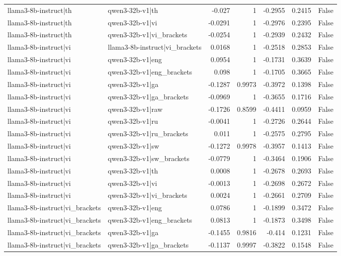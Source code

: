 \begin{table}
\begin{tabular}{l l r r r r l}
llama3-8b-instruct|th & qwen3-32b-v1|th & -0.027 & 1 & -0.2955 & 0.2415 & False \\
llama3-8b-instruct|th & qwen3-32b-v1|vi & -0.0291 & 1 & -0.2976 & 0.2395 & False \\
llama3-8b-instruct|th & qwen3-32b-v1|vi_brackets & -0.0254 & 1 & -0.2939 & 0.2432 & False \\
llama3-8b-instruct|vi & llama3-8b-instruct|vi_brackets & 0.0168 & 1 & -0.2518 & 0.2853 & False \\
llama3-8b-instruct|vi & qwen3-32b-v1|eng & 0.0954 & 1 & -0.1731 & 0.3639 & False \\
llama3-8b-instruct|vi & qwen3-32b-v1|eng_brackets & 0.098 & 1 & -0.1705 & 0.3665 & False \\
llama3-8b-instruct|vi & qwen3-32b-v1|ga & -0.1287 & 0.9973 & -0.3972 & 0.1398 & False \\
llama3-8b-instruct|vi & qwen3-32b-v1|ga_brackets & -0.0969 & 1 & -0.3655 & 0.1716 & False \\
llama3-8b-instruct|vi & qwen3-32b-v1|raw & -0.1726 & 0.8599 & -0.4411 & 0.0959 & False \\
llama3-8b-instruct|vi & qwen3-32b-v1|ru & -0.0041 & 1 & -0.2726 & 0.2644 & False \\
llama3-8b-instruct|vi & qwen3-32b-v1|ru_brackets & 0.011 & 1 & -0.2575 & 0.2795 & False \\
llama3-8b-instruct|vi & qwen3-32b-v1|sw & -0.1272 & 0.9978 & -0.3957 & 0.1413 & False \\
llama3-8b-instruct|vi & qwen3-32b-v1|sw_brackets & -0.0779 & 1 & -0.3464 & 0.1906 & False \\
llama3-8b-instruct|vi & qwen3-32b-v1|th & 0.0008 & 1 & -0.2678 & 0.2693 & False \\
llama3-8b-instruct|vi & qwen3-32b-v1|vi & -0.0013 & 1 & -0.2698 & 0.2672 & False \\
llama3-8b-instruct|vi & qwen3-32b-v1|vi_brackets & 0.0024 & 1 & -0.2661 & 0.2709 & False \\
llama3-8b-instruct|vi_brackets & qwen3-32b-v1|eng & 0.0786 & 1 & -0.1899 & 0.3472 & False \\
llama3-8b-instruct|vi_brackets & qwen3-32b-v1|eng_brackets & 0.0813 & 1 & -0.1873 & 0.3498 & False \\
llama3-8b-instruct|vi_brackets & qwen3-32b-v1|ga & -0.1455 & 0.9816 & -0.414 & 0.1231 & False \\
llama3-8b-instruct|vi_brackets & qwen3-32b-v1|ga_brackets & -0.1137 & 0.9997 & -0.3822 & 0.1548 & False \\

\end{tabular}
\end{table}
